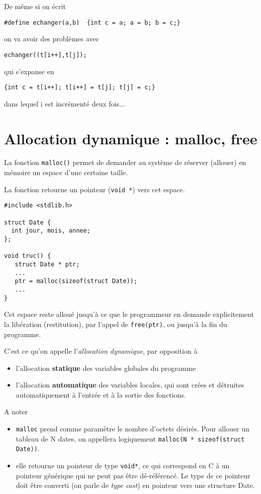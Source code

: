 \documentclass[10pt]{article}
\begin{document}
De même si on écrit
\begin{lstlisting}
#define echanger(a,b)  {int c = a; a = b; b = c;}
\end{lstlisting}
on va avoir des problèmes avec
\begin{lstlisting}
echanger((t[i++],t[j]);
\end{lstlisting}
qui s'expanse en 
\begin{lstlisting}
{int c = t[i++]; t[i++] = t[j]; t[j] = c;}
\end{lstlisting}
dans lequel i est incrémenté deux fois...

\section{Allocation dynamique : malloc, free}

La fonction \texttt{malloc()} permet de demander au système de
réserver (allouer) en mémoire un espace d'une certaine taille.

La fonction retourne un pointeur (\texttt{void *}) vers cet espace.

\begin{lstlisting}
#include <stdlib.h>

struct Date {
  int jour, mois, annee;
};

void truc() {
   struct Date * ptr;
   ...
   ptr = malloc(sizeof(struct Date));
   ...
}
\end{lstlisting}

Cet espace reste alloué jusqu'à ce que le programmeur en demande
explicitement la libération (restitution), par l'appel de
\texttt{free(ptr)}, ou jusqu'à la fin du programme.

C'est ce qu'on appelle l'\emph{allocation dynamique}, par opposition à
\begin{itemize}
\item l'allocation \textbf{statique} des variables globales du programme
\item l'allocation \textbf{automatique} des variables locales, qui sont crées et détruites
automatiquement à l'entrée et à la sortie des fonctions.
\end{itemize}

A noter
\begin{itemize}
\item \texttt{malloc} prend comme paramètre le nombre d'octets désirés. Pour allouer un 
tableau de N dates,  on appellera logiquement \texttt{malloc(N * sizeof(struct Date))}.
\item elle retourne un pointeur de type \texttt{void*}, ce qui
  correspond en C à un pointeur générique qui ne peut pas être
  dé-référencé.  Le type de ce pointeur doit être converti (on parle de
  \emph{type cast}) en pointeur vers une structure Date.
\end{itemize}
\end{document}
